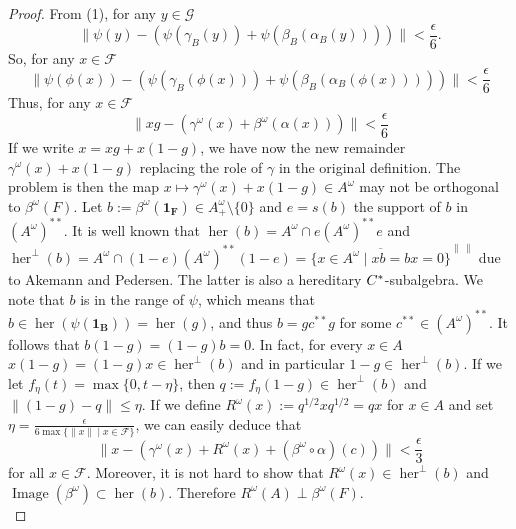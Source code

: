 \documentclass[12pt]{amsart}
\theoremstyle{plain}
\theoremstyle{definition}
\def \Image{\operatorname{Image}}
\def\her{\operatorname{her}}
\newcommand{\mc}{\mathcal}
\numberwithin{equation}{section}
\begin{document}
\begin{proof}
From (1), for any  $y \in \mc{G}$  
\begin{equation}
\| \psi(y) -(\psi(\gamma_B (y))+ \psi (\beta_B(\alpha_B(y)))) \| < \frac{\epsilon}{6}.
\end{equation}
So, for  any $x \in \mc{F}$
\begin{equation}
\| \psi(\phi(x)) -(\psi(\gamma_B (\phi(x)))+ \psi (\beta_B(\alpha_B(\phi(x))))) \| < \frac{\epsilon}{6}
\end{equation}
Thus, for  any $x \in \mc{F}$
\begin{equation}
\| xg -(\gamma^{\omega} (x)+  \beta^{\omega} (\alpha(x)) ) \| < \frac{\epsilon}{6}
\end{equation}
If we write $x=xg+ x(1-g)$, we have now the new remainder $\gamma^{\omega}(x) + x(1-g)$ replacing the role of $\gamma$ in the original definition. The problem is then the map $x \mapsto \gamma^{\omega}(x)+ x(1-g) \in A^{\omega}$ may not be orthogonal to $\beta^{\omega}(F)$. Let $b:=\beta^{\omega}(\mathbf{1_F}) \in A^{\omega}_{+} \setminus \{0\}$ and  $e=s(b)$ the support of $b$ in $(A^{\omega})^{**}$. It is well known that $\her(b)= A^{\omega}\cap e(A^{\omega})^{**}e$    and $\her^{\perp}(b)= A^{\omega}\cap (1-e)(A^{\omega})^{**}(1-e)= \overline{\{x \in A^{\omega} \mid xb=bx=0 \}}^{\| \,\|}$ due to Akemann and Pedersen. The latter is also a hereditary $C\sp*$-subalgebra.  
We note that $b$ is in the range of $\psi$, which means that $b \in \her(\psi(\mathbf{1_B}))=\her(g)$, and thus  $b=gc^{**}g$ for some $c^{**} \in (A^{\omega})^{**}$.  It follows that $b(1-g)=(1-g)b=0$. In fact, for every $x\in A$ $x(1-g)=(1-g)x \in \her^{\perp}(b)$ and in particular $1-g \in \her^{\perp}(b)$.  If we let $f_{\eta}(t)=\max\{0, t-\eta\}$, then $q:= f_{\eta}(1-g) \in \her^{\perp}(b)$ and $\| (1-g) -q\| \le \eta$. If we define $R^{\omega}(x):=q^{1/2}xq^{1/2}=qx$ for $x\in A$ and set $\eta= \frac{\epsilon}{ 6 \max\{ \|x\| \mid x\in \mc{F}\}}$, we can easily deduce that 
\begin{equation}
\| x - (\gamma^{\omega}(x) + R^{\omega}(x) + (\beta^{\omega}\circ \alpha)(c)) \| < \frac{\epsilon}{3}
\end{equation}
for all $x\in \mc{F}$. 
Moreover,  it is not hard to show that $R^{\omega}(x)\in \her^{\perp}(b)$ and $\Image( \beta^{\omega} )\subset \her(b)$. Therefore $R^{\omega}(A) \perp \beta^{\omega}(F)$.\\


\end{proof}
\end{document}
